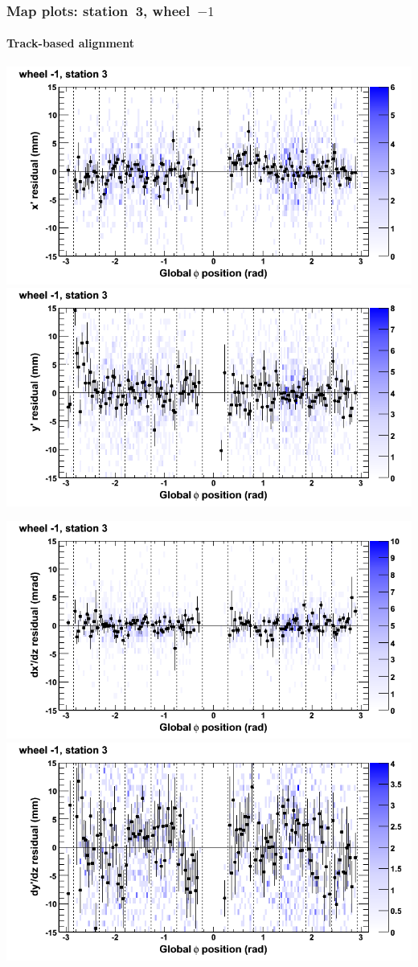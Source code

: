 \documentclass[compress]{beamer}
\begin{document}
\begin{frame}
\frametitle{Map plots: station~3, wheel~$-1$}
\framesubtitle{Track-based alignment}
\includegraphics[width=0.5\linewidth]{mapplots_re05/DTvsphi_st3whB_x.png}
\includegraphics[width=0.5\linewidth]{mapplots_re05/DTvsphi_st3whB_y.png}

\includegraphics[width=0.5\linewidth]{mapplots_re05/DTvsphi_st3whB_dxdz.png}
\includegraphics[width=0.5\linewidth]{mapplots_re05/DTvsphi_st3whB_dydz.png}
\end{frame}
\end{document}
